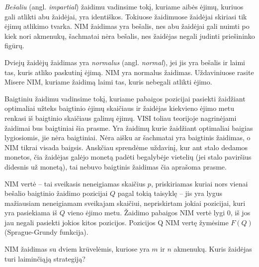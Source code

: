 \begin{api}
  \emph{Bešaliu} (angl. \emph{impartial}) žaidimu vadinsime tokį, kuriame aibės ėjimų, kuriuos gali atlikti abu žaidėjai, yra identiškos. 
Tokiuose žaidimuose žaidėjai skiriasi tik ėjimų atlikimo tvarka. NIM žaidimas yra bešalis, nes abu žaidėjai gali nuimti po kiek nori akmenukų, šachmatai nėra bešalis, nes žaidėjas negali judinti priešininko figūrų. 
\end{api}

\begin{api}
  Dviejų žaidėjų žaidimas yra \emph{normalus} (angl. \emph{normal}), jei jis yra bešalis ir laimi
  tas, kuris atliko paskutinį ėjimą. NIM yra normalus žaidimas. Uždaviniuose rasite Misere NIM, kuriame žaidimą laimi tas, kuris nebegali atlikti ėjimo. 
\end{api}

\begin{api}
Baigtiniu žaidimu vadinsime tokį, kuriame pabaigos pozicijai pasiekti žaidžiant optimaliai užteks baigtinio ėjimų skaičiaus ir žaidėjas kiekvieno ėjimo metu renkasi iš baigtinio skaičiaus galimų ėjimų. 
VISI toliau teorijoje nagrinėjami žaidimai bus baigtiniai šia prasme. Yra žaidimų kurie žaidžiant optimaliai baigias lygiosiomis, jie nėra baigtiniai. Nėra aišku ar šachmatai yra baigtinis žaidimas, 
o NIM tikrai visada baigsis. Anskčiau sprendėme uždavinį, kur ant stalo dedamos monetos, čia žaidėjas galėjo monetą padėti begalybėje vietelių (jei stalo paviršius didesnis už monetą), tai nebuvo baigtinis žaidimas čia aprašoma prasme.
\end{api}

\begin{api}
  NIM vertė -- tai sveikasis neneigiamas skaičius $p$, priskiriamas kuriai
  nors vienai bešalio baigtinio žaidimo pozicijai $Q$ pagal tokią taisyklę -- jis yra
  lygus mažiausiam neneigiamam sveikajam skaičiui, nepriskirtam jokiai
  pozicijai, kuri yra pasiekiama iš $Q$ vieno ėjimo metu. Žaidimo pabaigos NIM vertė lygi $0$, iš jos jau negali pasiekti jokios kitos pozicijos. Pozicijos Q NIM vertę žymėsime $F(Q)$ (Sprague-Grundy funkcija).
\end{api}   

\begin{pavnr}
NIM žaidimas su dviem krūvelėmis, kuriose yra $m$ ir $n$ akmenukų. Kuris žaidėjas turi laiminčiąją strategiją?
\end{pavnr}

